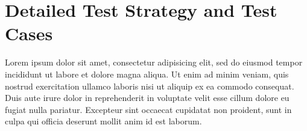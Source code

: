 \documentclass[report.tex]{subfiles}
\begin{document}
\chapter{Detailed Test Strategy and Test Cases} %
\label{cha:detailed_test_strategy_and_test_cases}
Lorem ipsum dolor sit amet, consectetur adipisicing elit, sed do eiusmod
tempor incididunt ut labore et dolore magna aliqua. Ut enim ad minim veniam,
quis nostrud exercitation ullamco laboris nisi ut aliquip ex ea commodo
consequat. Duis aute irure dolor in reprehenderit in voluptate velit esse
cillum dolore eu fugiat nulla pariatur. Excepteur sint occaecat cupidatat non
proident, sunt in culpa qui officia deserunt mollit anim id est laborum.

\newpage
\end{document}

